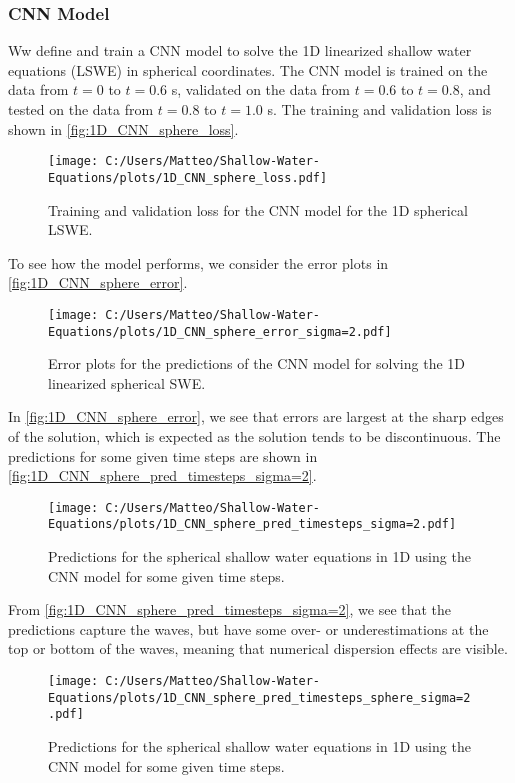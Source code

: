 \subsubsection*{CNN Model}
Ww define and train a CNN model to solve the 1D linearized shallow water equations (LSWE) in spherical coordinates.
The CNN model is trained on the data from $t = 0$ to $t = 0.6$ s, validated on the data from $t = 0.6$ to $t = 0.8$, and tested on the data from $t = 0.8$ to $t = 1.0$ s.
The training and validation loss is shown in \autoref{fig:1D_CNN_sphere_loss}.
\begin{figure}[H]
    \centering
    \texttt{[image: C:/Users/Matteo/Shallow-Water-Equations/plots/1D\_CNN\_sphere\_loss.pdf]}
    \caption{Training and validation loss for the CNN model for the 1D spherical LSWE.}\label{fig:1D_CNN_sphere_loss}
\end{figure}
To see how the model performs, we consider the error plots in \autoref{fig:1D_CNN_sphere_error}.
\begin{figure}[H]
    \centering
    \texttt{[image: C:/Users/Matteo/Shallow-Water-Equations/plots/1D\_CNN\_sphere\_error\_sigma=2.pdf]}
    \caption{Error plots for the predictions of the CNN model for solving the 1D linearized spherical SWE.}\label{fig:1D_CNN_sphere_error}
\end{figure}
In \autoref{fig:1D_CNN_sphere_error}, we see that errors are largest at the sharp edges of the solution, which is expected as the solution tends to be discontinuous.
The predictions for some given time steps are shown in \autoref{fig:1D_CNN_sphere_pred_timesteps_sigma=2}.
\begin{figure}[H]
    \centering
    \texttt{[image: C:/Users/Matteo/Shallow-Water-Equations/plots/1D\_CNN\_sphere\_pred\_timesteps\_sigma=2.pdf]}
    \caption{Predictions for the spherical shallow water equations in 1D using the CNN model for some given time steps.}\label{fig:1D_CNN_sphere_pred_timesteps_sigma=2}
\end{figure}
From \autoref{fig:1D_CNN_sphere_pred_timesteps_sigma=2}, we see that the predictions capture the waves, but have some over- or underestimations at the top or bottom of the waves, meaning that numerical dispersion effects are visible.
\begin{figure}[H]
    \centering
    \texttt{[image: C:/Users/Matteo/Shallow-Water-Equations/plots/1D\_CNN\_sphere\_pred\_timesteps\_sphere\_sigma=2.pdf]}
    \caption{Predictions for the spherical shallow water equations in 1D using the CNN model for some given time steps.}\label{fig:1D_CNN_sphere_pred_timesteps_sphere_sigma=2}
\end{figure}


